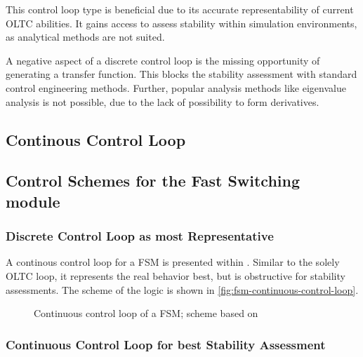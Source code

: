This control loop type is beneficial due to its accurate representability of current \acs{OLTC} abilities. It gains access to assess stability within simulation environments, as analytical methods are not suited.

A negative aspect of a discrete control loop is the missing opportunity of generating a transfer function. This blocks the stability assessment with standard control engineering methods. Further, popular analysis methods like eigenvalue analysis is not possible, due to the lack of possibility to form derivatives.


\subsection{Continous Control Loop}

\subsection{Control Schemes for the Fast Switching module}

\subsubsection{Discrete Control Loop as most Representative}
A continous control loop for a \acs{FSM} is presented within \textcite{burlakinEnhancedVoltageControl2024,burlakinEnhancingVariableShunt2024}. Similar to the solely \acs{OLTC} loop, it represents the real behavior best, but is obstructive for stability assessments. The scheme of the logic is shown in \autoref{fig:fsm-continuous-control-loop}.

\begin{figure}[htb!]
        \centering
        \caption{Continuous control loop of a \acs{FSM}; scheme based on \textcite{burlakinEnhancedVoltageControl2024}}
        \label{fig:fsm-continuous-control-loop}
\end{figure}

\subsubsection{Continuous Control Loop for best Stability Assessment}

